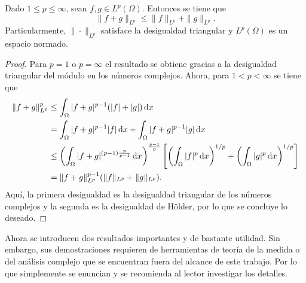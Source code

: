 \begin{proposition}
    Dado $1\leq p\leq\infty$, sean $f,g\in L^p(\Omega)$. Entonces se tiene que
    \begin{equation*}
        \|f+g\|_{L^p} \leq \|f\|_{L^p} +
        \|g\|_{L^p}.
    \end{equation*}
    Particularmente, $\|\cdot\|_{L^p}$ satisface la desigualdad triangular
    y $L^p(\Omega)$ es un espacio normado.
\end{proposition}
\begin{proof}
    Para $p=1$ o $p=\infty$ el resultado se obtiene gracias a la desigualdad
    triangular del módulo en los números complejos. Ahora, para $1<p<\infty$ 
    se tiene que
    \begin{align*}
        \|f+g\|_{L^p}^p & \leq \int_\Omega |f+g|^{p-1}(|f|+|g|)\mathop{}\!\mathrm{d} x\\
        & = \int_\Omega |f+g|^{p-1}|f| \mathop{}\!\mathrm{d} x + 
        \int_\Omega |f+g|^{p-1}|g| \mathop{}\!\mathrm{d} x \\
        & \leq \left( 
            \int_\Omega |f+g|^{(p-1) \frac{p}{p-1}} \mathop{}\!\mathrm{d} x 
        \right)^{\frac{p-1}{p}} \left[
            \left(\int_\Omega |f|^p\mathop{}\!\mathrm{d} x\right)^{1/p} +
            \left(\int_\Omega |g|^p\mathop{}\!\mathrm{d} x\right)^{1/p}
        \right] \\ 
        & = \|f+g\|_{L^p}^{p-1}(\|f\|_{L^p} + \|g\|_{L^p}).
    \end{align*}
    Aquí, la primera desigualdad es la desigualdad triangular de los números
    complejos y la segunda es la desigualdad de H\"older, por lo que se concluye
    lo deseado.
\end{proof}

Ahora se introducen dos resultados importantes y de bastante utilidad. Sin embargo,
sus demostraciones requieren de herramientas de teoría de la medida o del 
análisis complejo que se encuentran fuera del alcance de este trabajo. Por lo que
simplemente se enuncian y se recomienda al lector investigar los detalles.

